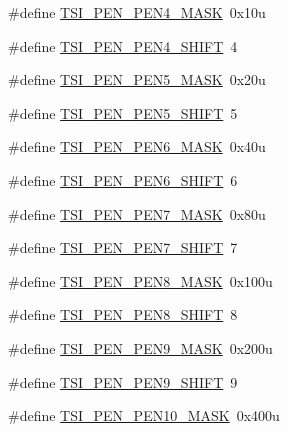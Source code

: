 \begin{DoxyCompactItemize}
\item 
\#define \hyperlink{group___t_s_i___register___masks_ga84dcc37edb4ed1b883f85b639092a9cb}{T\+S\+I\+\_\+\+P\+E\+N\+\_\+\+P\+E\+N4\+\_\+\+M\+A\+SK}~0x10u
\item 
\#define \hyperlink{group___t_s_i___register___masks_gab5aa48e30efdd8e8f431087e7c115ef0}{T\+S\+I\+\_\+\+P\+E\+N\+\_\+\+P\+E\+N4\+\_\+\+S\+H\+I\+FT}~4
\item 
\#define \hyperlink{group___t_s_i___register___masks_ga6fa4ed2566d9f9a2ea99816a0f362284}{T\+S\+I\+\_\+\+P\+E\+N\+\_\+\+P\+E\+N5\+\_\+\+M\+A\+SK}~0x20u
\item 
\#define \hyperlink{group___t_s_i___register___masks_gac570df6433fa24603f53ef4ec29d1462}{T\+S\+I\+\_\+\+P\+E\+N\+\_\+\+P\+E\+N5\+\_\+\+S\+H\+I\+FT}~5
\item 
\#define \hyperlink{group___t_s_i___register___masks_ga6ea52be49c67caff3c6aec70425f6da7}{T\+S\+I\+\_\+\+P\+E\+N\+\_\+\+P\+E\+N6\+\_\+\+M\+A\+SK}~0x40u
\item 
\#define \hyperlink{group___t_s_i___register___masks_ga3c47b02418ccd8b31132ecfdd45bdd9c}{T\+S\+I\+\_\+\+P\+E\+N\+\_\+\+P\+E\+N6\+\_\+\+S\+H\+I\+FT}~6
\item 
\#define \hyperlink{group___t_s_i___register___masks_ga647e31fe5802735f69fa70e752b881b3}{T\+S\+I\+\_\+\+P\+E\+N\+\_\+\+P\+E\+N7\+\_\+\+M\+A\+SK}~0x80u
\item 
\#define \hyperlink{group___t_s_i___register___masks_ga8a68b8de1664c9980b3f742c8a1427c2}{T\+S\+I\+\_\+\+P\+E\+N\+\_\+\+P\+E\+N7\+\_\+\+S\+H\+I\+FT}~7
\item 
\#define \hyperlink{group___t_s_i___register___masks_ga98c6aab58655c83b856f21f804c7c439}{T\+S\+I\+\_\+\+P\+E\+N\+\_\+\+P\+E\+N8\+\_\+\+M\+A\+SK}~0x100u
\item 
\#define \hyperlink{group___t_s_i___register___masks_ga822574504a16f31bf6172fc5b582f963}{T\+S\+I\+\_\+\+P\+E\+N\+\_\+\+P\+E\+N8\+\_\+\+S\+H\+I\+FT}~8
\item 
\#define \hyperlink{group___t_s_i___register___masks_ga614663f54a6b349074b981f83bda0e84}{T\+S\+I\+\_\+\+P\+E\+N\+\_\+\+P\+E\+N9\+\_\+\+M\+A\+SK}~0x200u
\item 
\#define \hyperlink{group___t_s_i___register___masks_ga23492a8b439df4e9414fbae2cf54742f}{T\+S\+I\+\_\+\+P\+E\+N\+\_\+\+P\+E\+N9\+\_\+\+S\+H\+I\+FT}~9
\item 
\#define \hyperlink{group___t_s_i___register___masks_ga4a5e83e197e558ed636a8531f63a51a0}{T\+S\+I\+\_\+\+P\+E\+N\+\_\+\+P\+E\+N10\+\_\+\+M\+A\+SK}~0x400u
\item 

\end{DoxyCompactItemize}

